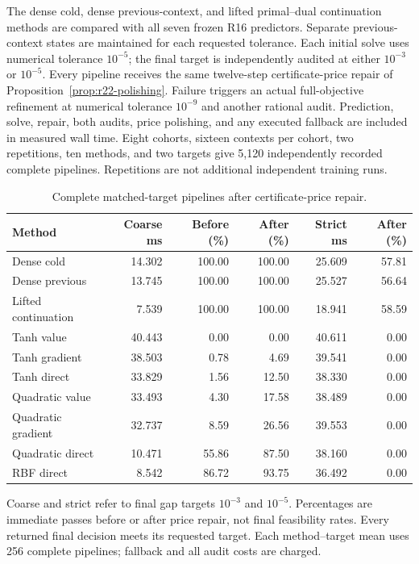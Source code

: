 \documentclass[11pt,letterpaper]{article}
\theoremstyle{definition}
\newcommand{\1}{\mathbf 1}
\begin{document}
The dense cold, dense previous-context, and lifted primal--dual continuation methods are compared with all seven frozen R16 predictors. Separate previous-context states are maintained for each requested tolerance. Each initial solve uses numerical tolerance $10^{-5}$; the final target is independently audited at either $10^{-3}$ or $10^{-5}$. Every pipeline receives the same twelve-step certificate-price repair of Proposition~\ref{prop:r22-polishing}. Failure triggers an actual full-objective refinement at numerical tolerance $10^{-9}$ and another rational audit. Prediction, solve, repair, both audits, price polishing, and any executed fallback are included in measured wall time. Eight cohorts, sixteen contexts per cohort, two repetitions, ten methods, and two targets give 5,120 independently recorded complete pipelines. Repetitions are not additional independent training runs.


\begin{table}[tbp]\centering\small
\caption{Complete matched-target pipelines after certificate-price repair.}\label{tab:r22-cost}
\begin{tabular}{lrrrrr}
\toprule
Method & Coarse ms & Before (\%) & After (\%) & Strict ms & After (\%)\\
\midrule
Dense cold & 14.302 & 100.00 & 100.00 & 25.609 & 57.81\\
Dense previous & 13.745 & 100.00 & 100.00 & 25.527 & 56.64\\
Lifted continuation & 7.539 & 100.00 & 100.00 & 18.941 & 58.59\\
Tanh value & 40.443 & 0.00 & 0.00 & 40.611 & 0.00\\
Tanh gradient & 38.503 & 0.78 & 4.69 & 39.541 & 0.00\\
Tanh direct & 33.829 & 1.56 & 12.50 & 38.330 & 0.00\\
Quadratic value & 33.493 & 4.30 & 17.58 & 38.489 & 0.00\\
Quadratic gradient & 32.737 & 8.59 & 26.56 & 39.553 & 0.00\\
Quadratic direct & 10.471 & 55.86 & 87.50 & 38.160 & 0.00\\
RBF direct & 8.542 & 86.72 & 93.75 & 36.492 & 0.00\\
\bottomrule
\end{tabular}
\par\smallskip\begin{minipage}{.98\textwidth}\small Coarse and strict refer to final gap targets $10^{-3}$ and $10^{-5}$. Percentages are immediate passes before or after price repair, not final feasibility rates. Every returned final decision meets its requested target. Each method--target mean uses 256 complete pipelines; fallback and all audit costs are charged.\end{minipage}
\end{table}
\end{document}
